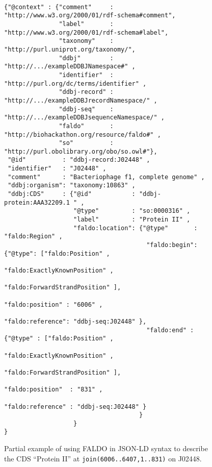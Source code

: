 \begin{figure}
\begin{shaded}
\small
\begin{verbatim}

{"@context" : {"comment"     : "http://www.w3.org/2000/01/rdf-schema#comment",
               "label"       : "http://www.w3.org/2000/01/rdf-schema#label",
               "taxonomy"    : "http://purl.uniprot.org/taxonomy/",
               "ddbj"        : "http://.../exampleDDBJNamespace#" ,
               "identifier"  : "http://purl.org/dc/terms/identifier" ,
               "ddbj-record" : "http://.../exampleDDBJrecordNamespace/" ,
               "ddbj-seq"    : "http://.../exampleDDBJsequenceNamespace/" ,
               "faldo"       : "http://biohackathon.org/resource/faldo#" ,
               "so"          : "http://purl.obolibrary.org/obo/so.owl#"},
 "@id"          : "ddbj-record:J02448" ,
 "identifier"   : "J02448" ,
 "comment"      : "Bacteriophage f1, complete genome" ,
 "ddbj:organism": "taxonomy:10863" ,
 "ddbj:CDS"     : {"@id"           : "ddbj-protein:AAA32209.1 " ,
                   "@type"         : "so:0000316" ,
                   "label"         : "Protein II" ,
                   "faldo:location": {"@type"       : "faldo:Region" ,
                                       "faldo:begin": {"@type": ["faldo:Position" , 
                                                                 "faldo:ExactlyKnownPosition" ,
                                                                 "faldo:ForwardStrandPosition" ],
                                                       "faldo:position" : "6006" ,
                                                       "faldo:reference": "ddbj-seq:J02448" },
                                       "faldo:end" : {"@type" : ["faldo:Position" , 
                                                                 "faldo:ExactlyKnownPosition" ,
                                                                 "faldo:ForwardStrandPosition" ],
                                                      "faldo:position"  : "831" ,
                                                      "faldo:reference" : "ddbj-seq:J02448" }
                                     }
                   }
}
\end{verbatim}
\end{shaded}
\caption{Partial example of using FALDO in JSON-LD syntax to describe
the CDS ``Protein II'' at \texttt{join(6006..6407,1..831)} on J02448.}
\label{fig:insdcReverseOverOrigin}
\end{figure}


